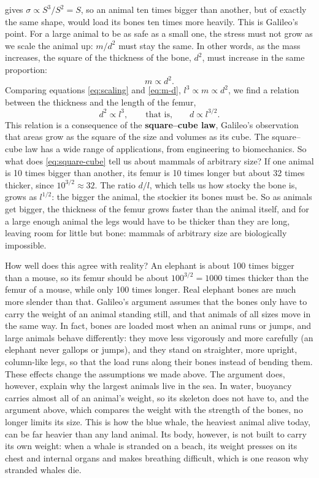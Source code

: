 \documentclass[11pt,a4paper]{article}
\begin{document}
gives $\sigma \propto S^3/S^2 = S$, so an animal ten times bigger than another, but of exactly the
same shape, would load its bones ten times more heavily. This is Galileo's point. For a large
animal to be as safe as a small one, the stress must not grow as we scale the animal up: $m/d^2$
must stay the same. In other words, as the mass increases, the square of the thickness of the bone,
$d^2$, must increase in the same proportion:
\begin{equation}\label{eq:m-d}
  m \propto d^2 .
\end{equation}
Comparing equations \eqref{eq:scaling} and \eqref{eq:m-d}, $l^3 \propto m \propto d^2$, we find a
relation between the thickness and the length of the femur,
\begin{equation}\label{eq:square-cube}
  d^2 \propto l^3 , \qquad\text{that is,}\qquad d \propto l^{3/2} .
\end{equation}
This relation is a consequence of the \textbf{square--cube law}, Galileo's observation that areas
grow as the square of the size and volumes as its cube. The square--cube law has a wide range of
applications, from engineering to biomechanics. So what does \eqref{eq:square-cube} tell us about
mammals of arbitrary size? If one animal is 10 times bigger than another, its femur is 10 times
longer but about 32 times thicker, since $10^{3/2}\approx 32$. The ratio $d/l$, which tells us how
stocky the bone is, grows as $l^{1/2}$: the bigger the animal, the stockier its bones must be. So as
animals get bigger, the thickness of the femur grows faster than the animal itself, and for a large
enough animal the legs would have to be thicker than they are long, leaving room for little but
bone: mammals of arbitrary size are biologically impossible.

How well does this agree with reality? An elephant is about 100 times bigger than a mouse, so its
femur should be about $100^{3/2} = 1000$ times thicker than the femur of a mouse, while only 100
times longer. Real elephant bones are much more slender than that. Galileo's argument assumes that
the bones only have to carry the weight of an animal standing still, and that animals of all sizes
move in the same way. In fact, bones are loaded most when an animal runs or jumps, and large
animals behave differently: they move less vigorously and more carefully (an elephant never gallops
or jumps), and they stand on straighter, more upright, column-like legs, so that the load runs
along their bones instead of bending them. These effects change the assumptions we made above. The
argument does, however, explain why the largest animals live in the sea. In water, buoyancy carries
almost all of an animal's weight, so its skeleton does not have to, and the argument above, which
compares the weight with the strength of the bones, no longer limits its size. This is how the blue
whale, the heaviest animal alive today, can be far heavier than any land animal. Its body, however,
is not built to carry its own weight: when a whale is stranded on a beach, its weight presses on its
chest and internal organs and makes breathing difficult, which is one reason why stranded whales
die.
\end{document}
